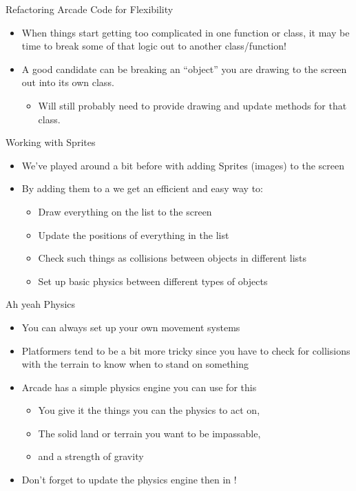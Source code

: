 \documentclass[pdf, aspectratio=169, 12pt]{beamer}
\begin{document}
\begin{frame}{Refactoring Arcade Code for Flexibility}
	\begin{itemize}
		\item When things start getting too complicated in one function or class, it may be time to break some of that logic out to another class/function!
		\item A good candidate can be breaking an ``object'' you are drawing to the screen out into its own class.
			\begin{itemize}
				\item Will still probably need to provide drawing and update methods for that class.
			\end{itemize}
	\end{itemize}
\end{frame}

\begin{frame}{Working with Sprites}
	\begin{itemize}
		\item We've played around a bit before with adding Sprites (images) to the screen
		\item By adding them to a  we get an efficient and easy way to:
			\begin{itemize}
				\item Draw everything on the list to the screen
				\item Update the positions of everything in the list
				\item Check such things as collisions between objects in different lists
				\item Set up basic physics between different types of objects
			\end{itemize}
	\end{itemize}
\end{frame}

\begin{frame}{Ah yeah Physics}
	\begin{itemize}
		\item You can always set up your own movement systems
		\item Platformers tend to be a bit more tricky since you have to check for collisions with the terrain to know when to stand on something
		\item Arcade has a simple physics engine you can use for this
			\begin{itemize}
				\item You give it the things you can the physics to act on,
				\item The solid land or terrain you want to be impassable,
				\item and a strength of gravity
			\end{itemize}
		\item Don't forget to update the physics engine then in !
			
	\end{itemize}
	
\end{frame}
\end{document}
